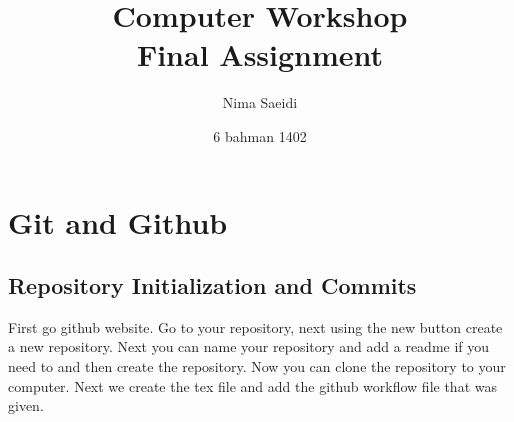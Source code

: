 \documentclass[titlepage]{article}
\title{\textbf{Computer Workshop\\ Final Assignment}}
\author{Nima Saeidi}
\date{6 bahman 1402}
\begin{document}
\maketitle
\tableofcontents

\newpage

\pagestyle{fancy}
\fancyhead[L]{}
\fancyfoot[C]{\thepage} 
\lhead{\thepage}




\section{Git and Github}
\subsection{Repository Initialization and Commits}
First go github website. Go to your repository, next using the new button create a new repository. Next you can name your repository and add a readme if you need to and then create the repository. Now you can clone the repository to your computer. Next we create the tex file and add the github workflow file that was given.
\end{document}
